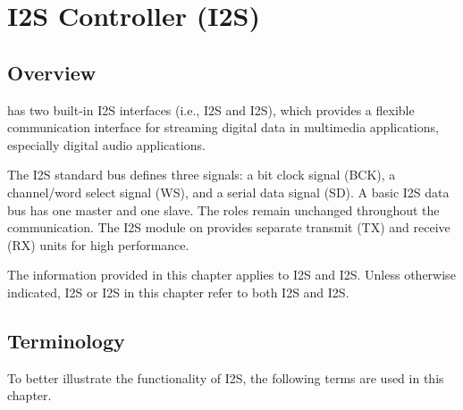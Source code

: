 \documentclass[main\_\_CN.tex]{subfiles}
\begin{document}

\ifglobal
\else
    {\let\clearpage\relax \listoftodos}
    \tableofcontents
\fi




\hypertarget{i2s}{}
\chapter{I2S Controller (I2S)}
\label{mod:i2s}

\section{Overview}
\chipname{} has two built-in I2S interfaces (i.e., I2S and I2S), which provides a flexible communication interface for streaming digital data in multimedia applications, especially digital audio applications.

The I2S standard bus defines three signals: a bit clock signal (BCK), a channel/word select signal (WS), and a serial data signal (SD). A basic I2S data bus has one master and one slave. The roles remain unchanged throughout the communication. The I2S module on \chipname{} provides separate transmit (TX) and receive (RX) units for high performance.

\begin{tiplisting}
The information provided in this chapter applies to I2S and I2S. Unless otherwise indicated, I2S or I2S in this chapter refer to both I2S and I2S.
\end{tiplisting}

\section{Terminology}

To better illustrate the functionality of I2S, the following terms are used in this chapter.
\end{document}
